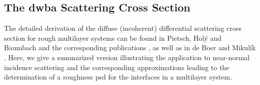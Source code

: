 \subsection{The \gls{dwba} Scattering Cross Section}
The detailed derivation of the diffuse (incoherent) differential scattering cross section for rough multilayer systems can be found in Pietsch, Hol\'{y} and Baumbach \cite{pietsch_high-resolution_2004} and the corresponding publications \cite{sinha_x-ray_1988,holy_nonspecular_1994}, as well as in de Boer \cite{de_boer_x-ray_1996} and Mikul\'{i}k \cite{mikulik_x-ray_1997}. Here, we give a summarized version illustrating the application to near-normal incidence scattering and the corresponding approximations leading to the determination of a roughness \gls{psd} for the interfaces in a multilayer system.

